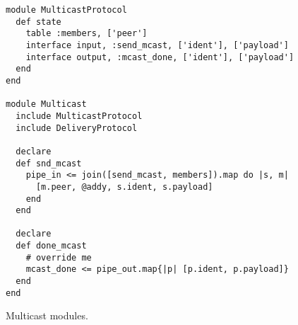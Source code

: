 \begin{figure}[t]
\begin{scriptsize}
\begin{lstlisting}
module MulticastProtocol
  def state
    table :members, ['peer']
    interface input, :send_mcast, ['ident'], ['payload']
    interface output, :mcast_done, ['ident'], ['payload']
  end
end

module Multicast
  include MulticastProtocol
  include DeliveryProtocol

  declare
  def snd_mcast
    pipe_in <= join([send_mcast, members]).map do |s, m|
      [m.peer, @addy, s.ident, s.payload]
    end
  end

  declare
  def done_mcast
    # override me
    mcast_done <= pipe_out.map{|p| [p.ident, p.payload]}
  end
end
\end{lstlisting}
\centering
\vspace{-10pt}
\caption{Multicast modules.}
\label{fig:multicast-impl}
\end{scriptsize}
\vspace{-2pt}
\end{figure}
